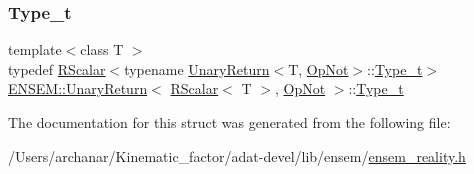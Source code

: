 \mbox{\label{structENSEM_1_1UnaryReturn_3_01RScalar_3_01T_01_4_00_01OpNot_01_4_af9f59bfbcb4e45c668599e7707d39a0c}} 
\subsubsection{\texorpdfstring{Type\_t}{Type\_t}\hspace{0.1cm}{\footnotesize\ttfamily [3/3]}}
{\footnotesize\ttfamily template$<$class T $>$ \\
typedef \mbox{\hyperlink{classENSEM_1_1RScalar}{R\+Scalar}}$<$typename \mbox{\hyperlink{structENSEM_1_1UnaryReturn}{Unary\+Return}}$<$T, \mbox{\hyperlink{structENSEM_1_1OpNot}{Op\+Not}}$>$\+::\mbox{\hyperlink{structENSEM_1_1UnaryReturn_3_01RScalar_3_01T_01_4_00_01OpNot_01_4_af9f59bfbcb4e45c668599e7707d39a0c}{Type\+\_\+t}}$>$ \mbox{\hyperlink{structENSEM_1_1UnaryReturn}{E\+N\+S\+E\+M\+::\+Unary\+Return}}$<$ \mbox{\hyperlink{classENSEM_1_1RScalar}{R\+Scalar}}$<$ T $>$, \mbox{\hyperlink{structENSEM_1_1OpNot}{Op\+Not}} $>$\+::\mbox{\hyperlink{structENSEM_1_1UnaryReturn_3_01RScalar_3_01T_01_4_00_01OpNot_01_4_af9f59bfbcb4e45c668599e7707d39a0c}{Type\+\_\+t}}}



The documentation for this struct was generated from the following file\+:\begin{DoxyCompactItemize}
\item 
/\+Users/archanar/\+Kinematic\+\_\+factor/adat-\/devel/lib/ensem/\mbox{\hyperlink{adat-devel_2lib_2ensem_2ensem__reality_8h}{ensem\+\_\+reality.\+h}}\end{DoxyCompactItemize}
